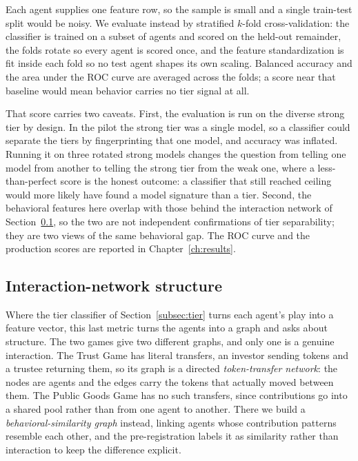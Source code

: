 Each agent supplies one feature row, so the sample is small and a single
train-test split would be noisy. We evaluate instead by stratified $k$-fold
cross-validation: the classifier is trained on a subset of agents and scored on
the held-out remainder, the folds rotate so every agent is scored once, and the
feature standardization is fit inside each fold so no test agent shapes its own
scaling. Balanced accuracy and the area under the ROC curve are averaged across
the folds; a score near that baseline would mean behavior carries no tier signal
at all.

That score carries two caveats. First, the evaluation is run on the
diverse strong tier by design. In the pilot the strong tier was a single model, so
a classifier could separate the tiers by fingerprinting that one model, and
accuracy was inflated. Running it on three rotated strong models changes the
question from telling one model from another to telling the strong tier from the
weak one, where a less-than-perfect score is the honest outcome: a classifier that
still reached ceiling would more likely have found a model signature than a tier. Second, the behavioral features here overlap
with those behind the interaction network of Section~\ref{subsec:network}, so the
two are not independent confirmations of tier separability; they are two views of
the same behavioral gap. The ROC curve and the production scores are reported in
Chapter~\ref{ch:results}.

\subsection{Interaction-network structure}
\label{subsec:network}

Where the tier classifier of Section~\ref{subsec:tier} turns each agent's play
into a feature vector, this last metric turns the agents into a graph and asks
about structure. The two games give two different graphs, and only one is a
genuine interaction. The Trust Game has literal transfers, an investor sending
tokens and a trustee returning them, so its graph is a directed
\emph{token-transfer network}: the nodes are agents and the edges carry the tokens
that actually moved between them. The Public Goods Game has no such transfers,
since contributions go into a shared pool rather than from one agent to another.
There we build a \emph{behavioral-similarity graph} instead, linking agents whose
contribution patterns resemble each other, and the pre-registration labels it as
similarity rather than interaction to keep the difference explicit.

